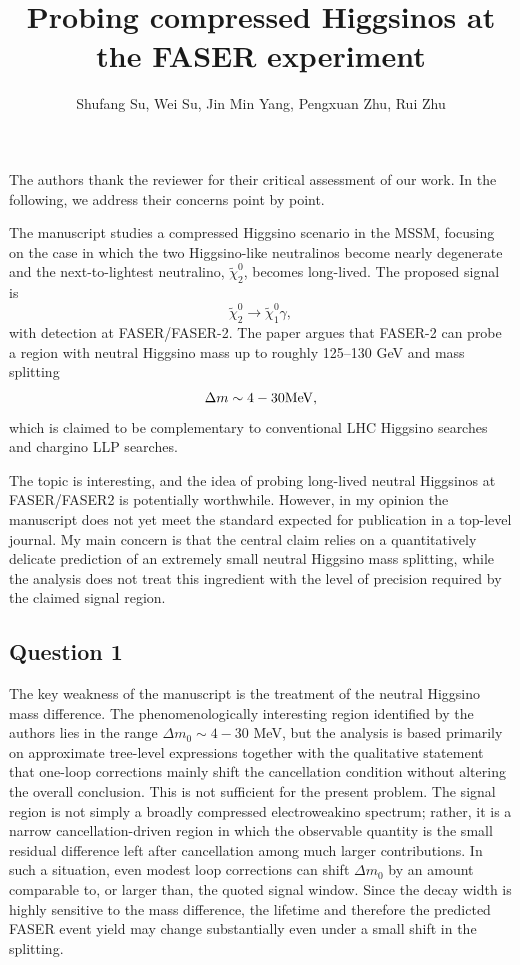 \documentclass{ar2rc}
\title{Probing compressed Higgsinos at the FASER experiment}
\author{Shufang Su, Wei Su, Jin Min Yang, Pengxuan Zhu, Rui Zhu}
\begin{document}
\maketitle

\par The authors thank the reviewer for their critical assessment of our work. In the following, we address their concerns point by point. 

\RC The manuscript studies a compressed Higgsino scenario in the MSSM, focusing on the case in which the two Higgsino-like neutralinos become nearly degenerate and the next-to-lightest neutralino, $\tilde{\chi}_2^0$, becomes long-lived. The proposed signal is
\begin{equation*}
	\tilde{\chi}_2^0 \to \tilde{\chi}_1^0 \gamma, 
\end{equation*}
with detection at FASER/FASER-2. The paper argues that FASER-2 can probe a region with neutral Higgsino mass up to roughly 125–130 GeV and mass splitting
\begin{equation*}
	\Delta m \sim 4 - 30 {\rm MeV}, 
\end{equation*}
which is claimed to be complementary to conventional LHC Higgsino searches and chargino LLP searches.

\RCpar The topic is interesting, and the idea of probing long-lived neutral Higgsinos at FASER/FASER2 is potentially worthwhile. However, in my opinion the manuscript does not yet meet the standard expected for publication in a top-level journal. My main concern is that the central
claim relies on a quantitatively delicate prediction of an extremely small neutral Higgsino mass splitting, while the analysis does not treat this ingredient with the level of precision required by the claimed signal region.

\subsection*{Question 1}
\RC The key weakness of the manuscript is the treatment of the neutral Higgsino mass difference. The phenomenologically interesting region identified by the authors lies in the range $\Delta m_0 \sim 4-30$ MeV, but the analysis is based primarily on approximate tree-level expressions together with the qualitative statement that one-loop corrections mainly shift the cancellation condition without altering the overall conclusion. This is not sufficient for the present problem. The signal region is not simply a broadly compressed electroweakino spectrum; rather, it is a narrow cancellation-driven region in which the observable quantity is the small residual difference left after cancellation among much larger contributions. In such a situation, even modest loop corrections can shift $\Delta m_0$ by an amount comparable to, or larger than, the quoted signal window. Since the decay width is highly sensitive to the mass difference, the lifetime and therefore the predicted FASER event yield may change substantially even under a small shift in the splitting.
\end{document}
